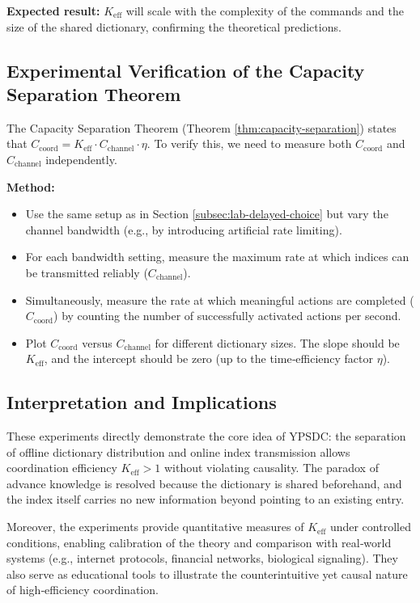 \documentclass[12pt]{article}
\begin{document}
	\textbf{Expected result:} \(K_{\mathrm{eff}}\) will scale with the complexity of the commands and the size of the shared dictionary, confirming the theoretical predictions.
	
	\subsection{Experimental Verification of the Capacity Separation Theorem}
	\label{subsec:capacity-theorem}
	
	The Capacity Separation Theorem (Theorem \ref{thm:capacity-separation}) states that \(C_{\text{coord}} = K_{\mathrm{eff}} \cdot C_{\text{channel}} \cdot \eta\). To verify this, we need to measure both \(C_{\text{coord}}\) and \(C_{\text{channel}}\) independently.
	
	\textbf{Method:}
	\begin{itemize}
		\item Use the same setup as in Section \ref{subsec:lab-delayed-choice} but vary the channel bandwidth (e.g., by introducing artificial rate limiting).
		\item For each bandwidth setting, measure the maximum rate at which indices can be transmitted reliably (\(C_{\text{channel}}\)).
		\item Simultaneously, measure the rate at which meaningful actions are completed (\(C_{\text{coord}}\)) by counting the number of successfully activated actions per second.
		\item Plot \(C_{\text{coord}}\) versus \(C_{\text{channel}}\) for different dictionary sizes. The slope should be \(K_{\mathrm{eff}}\), and the intercept should be zero (up to the time‑efficiency factor \(\eta\)).
	\end{itemize}
	
	\subsection{Interpretation and Implications}
	
	These experiments directly demonstrate the core idea of YPSDC: the separation of offline dictionary distribution and online index transmission allows coordination efficiency \(K_{\mathrm{eff}} > 1\) without violating causality. The paradox of advance knowledge is resolved because the dictionary is shared beforehand, and the index itself carries no new information beyond pointing to an existing entry.
	
	Moreover, the experiments provide quantitative measures of \(K_{\mathrm{eff}}\) under controlled conditions, enabling calibration of the theory and comparison with real‑world systems (e.g., internet protocols, financial networks, biological signaling). They also serve as educational tools to illustrate the counterintuitive yet causal nature of high‑efficiency coordination.
	
\end{document}
